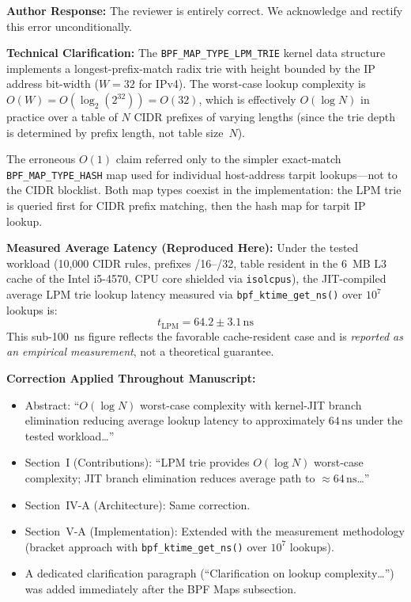 \documentclass[10pt,letterpaper]{article}
\begin{document}
\begin{authorbox}
\textbf{Author Response:}
The reviewer is entirely correct. We acknowledge and rectify this error
unconditionally.

\textbf{Technical Clarification:}
The \texttt{BPF\_MAP\_TYPE\_LPM\_TRIE} kernel data structure implements a
longest-prefix-match radix trie with height bounded by the IP address
bit-width ($W = 32$ for IPv4). The worst-case lookup complexity is
$O(W) = O(\log_2(2^{32})) = O(32)$, which is effectively $O(\log N)$ in
practice over a table of $N$ CIDR prefixes of varying lengths (since the trie
depth is determined by prefix length, not table size~$N$).

The erroneous $O(1)$ claim referred only to the simpler exact-match
\texttt{BPF\_MAP\_TYPE\_HASH} map used for individual host-address tarpit
lookups---not to the CIDR blocklist. Both map types coexist in the
implementation: the LPM trie is queried first for CIDR prefix matching, then
the hash map for tarpit IP lookup.

\textbf{Measured Average Latency (Reproduced Here):}
Under the tested workload (10,000 CIDR rules, prefixes /16--/32, table
resident in the 6~MB L3 cache of the Intel i5-4570, CPU core shielded via
\texttt{isolcpus}), the JIT-compiled average LPM trie lookup latency measured
via \texttt{bpf\_ktime\_get\_ns()} over $10^7$ lookups is:
\[
  t_{\mathrm{LPM}} = 64.2 \pm 3.1\,\mathrm{ns}
\]
This sub-100~ns figure reflects the favorable cache-resident case and is
\emph{reported as an empirical measurement}, not a theoretical guarantee.

\textbf{Correction Applied Throughout Manuscript:}
\begin{itemize}
  \item Abstract: ``$O(\log N)$ worst-case complexity with kernel-JIT branch
    elimination reducing average lookup latency to approximately $64\,\mathrm{ns}$
    under the tested workload\ldots''
  \item Section~I (Contributions): ``LPM trie provides $O(\log N)$ worst-case
    complexity; JIT branch elimination reduces average path to $\approx 64\,\mathrm{ns}$\ldots''
  \item Section~IV-A (Architecture): Same correction.
  \item Section~V-A (Implementation): Extended with the measurement methodology
    (bracket approach with \texttt{bpf\_ktime\_get\_ns()} over $10^7$ lookups).
  \item A dedicated clarification paragraph (``Clarification on lookup
    complexity\ldots'') was added immediately after the BPF Maps subsection.
\end{itemize}
\end{authorbox}
\end{document}
